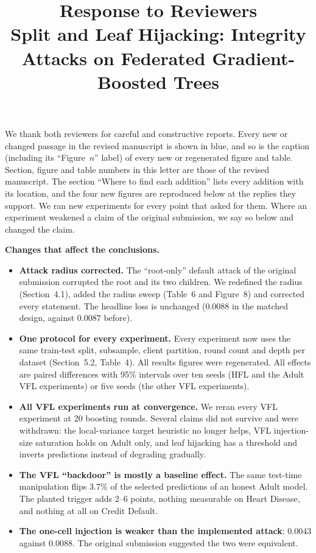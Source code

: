 \documentclass[11pt]{article}
\title{Response to Reviewers\\[2pt]\large Split and Leaf Hijacking: Integrity Attacks on Federated Gradient-Boosted Trees}
\date{}
\begin{document}
\maketitle

We thank both reviewers for careful and constructive reports. Every new or changed passage in the revised manuscript is shown in blue, and so is the caption (including its ``Figure~$n$'' label) of every new or regenerated figure and table. Section, figure and table numbers in this letter are those of the revised manuscript. The section ``Where to find each addition'' lists every addition with its location, and the four new figures are reproduced below at the replies they support. We ran new experiments for every point that asked for them. Where an experiment weakened a claim of the original submission, we say so below and changed the claim.

\textbf{Changes that affect the conclusions.}
\begin{itemize}
\item \textbf{Attack radius corrected.} The ``root-only'' default attack of the original submission corrupted the root and its two children. We redefined the radius (Section~4.1), added the radius sweep (Table~6 and Figure~8) and corrected every statement. The headline loss is unchanged (0.0088 in the matched design, against $0.0087$ before).
\item \textbf{One protocol for every experiment.} Every experiment now uses the same train-test split, subsample, client partition, round count and depth per dataset (Section~5.2, Table~4). All results figures were regenerated. All effects are paired differences with 95\% intervals over ten seeds (HFL and the Adult VFL experiments) or five seeds (the other VFL experiments).
\item \textbf{All VFL experiments run at convergence.} We reran every VFL experiment at 20 boosting rounds. Several claims did not survive and were withdrawn: the local-variance target heuristic no longer helps, VFL injection-size saturation holds on Adult only, and leaf hijacking has a threshold and inverts predictions instead of degrading gradually.
\item \textbf{The VFL ``backdoor'' is mostly a baseline effect.} The same test-time manipulation flips 3.7\% of the selected predictions of an honest Adult model. The planted trigger adds 2--6 points, nothing measurable on Heart Disease, and nothing at all on Credit Default.
\item \textbf{The one-cell injection is weaker than the implemented attack}: 0.0043 against 0.0088. The original submission suggested the two were equivalent.
\end{itemize}
\end{document}
